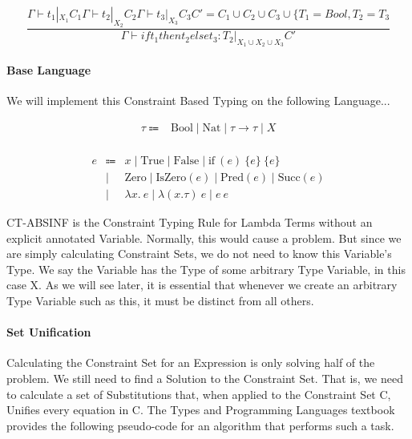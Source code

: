 \documentclass{article}
\begin{document}
\begin{equation}
    \frac{\Gamma \vdash t_{1} |_{X_{1}} C_{1} \Gamma \vdash t_{2} |_{X_{2}} C_{2} \Gamma \vdash t_{3} |_{X_{3}} C_{3}
    C' = C_{1} \cup C_{2} \cup C_{3} \cup \{T_{1} = Bool, T_{2} = T_{3}}
    {\Gamma \vdash if t_{1} then t_{2} else t_{3} : T_{2} |_{X_{1} \cup X_{2} \cup X_{3}} C'}
    \tag{CT-IF}
\end{equation}

\paragraph{Base Language} 
We will implement this Constraint Based Typing on the following Language...

\begin{equation*}
  \begin{array}{rcl}
    \tau \Coloneqq & \text{Bool} \mid \text{Nat} \mid \tau \to \tau \mid X \\
  \end{array}
\end{equation*}

\begin{equation*}
  \begin{array}{rcl}
    e & \Coloneqq & x \mid \text{True} \mid \text{False} \mid \text{if} \ (e) \ \{e\} \ \{e\} \\
      & \mid      & \text{Zero} \mid \text{IsZero}(e) \mid \text{Pred}(e) \mid \text{Succ}(e) \\
      & \mid      & \lambda x . \ e \mid \lambda (x.\tau) \ e \mid e \ e
  \end{array}
\end{equation*}

CT-ABSINF is the Constraint Typing Rule for Lambda Terms without an explicit annotated Variable. Normally, this would cause a problem. But since we are simply calculating Constraint Sets, we do not need to know this Variable's Type. We say the Variable has the Type of some arbitrary Type Variable, in this case X. As we will see later, it is essential that whenever we create an arbitrary Type Variable such as this, it must be distinct from all others.

\paragraph{Set Unification}

Calculating the Constraint Set for an Expression is only solving half of the problem. We still need to find a Solution to the Constraint Set. That is, we need to calculate a set of Substitutions that, when applied to the Constraint Set C, Unifies every equation in C. The Types and Programming Languages textbook provides the following pseudo-code for an algorithm that performs such a task.
\end{document}
